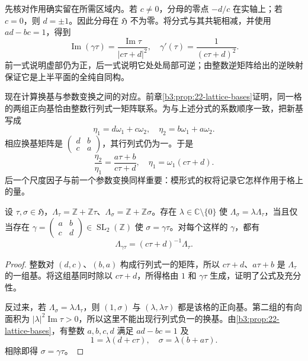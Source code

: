 先核对作用确实留在所需区域内。若 \(c\ne0\)，分母的零点 \(-d/c\) 在实轴上；若 \(c=0\)，则 \(d=\pm1\)。因此分母在 \(\mathfrak H\) 不为零。将分式与其共轭相减，并使用 \(ad-bc=1\)，得到
\begin{equation}\label{b3:eq:23-imaginary-transformation}
 \operatorname{Im}(\gamma\tau)
 =\frac{\operatorname{Im}\tau}{|c\tau+d|^2},
 \quad \gamma'(\tau)=\frac1{(c\tau+d)^2}.
\end{equation}
前一式说明虚部仍为正，后一式说明它处处局部可逆；由整数逆矩阵给出的逆映射保证它是上半平面的全纯自同构。

现在计算换基与参数变换之间的对应。前章\cref{b3:prop:22-lattice-bases}证明，同一格的两组正向基恰由整数行列式一矩阵联系。为与上述分式的系数顺序一致，把新基写成
\begin{equation}\label{b3:eq:23-basis-change}
 \eta_1=d\omega_1+c\omega_2,
 \quad \eta_2=b\omega_1+a\omega_2.
\end{equation}
相应换基矩阵是 \(\left(\begin{smallmatrix}d&b\\c&a\end{smallmatrix}\right)\)，其行列式仍为一。于是
\[
 \frac{\eta_2}{\eta_1}
 =\frac{a\tau+b}{c\tau+d},
 \quad \eta_1=\omega_1(c\tau+d).
\]
后一个尺度因子与前一个参数变换同样重要：模形式的权将记录它怎样作用于格上的量。

\begin{proposition}[参数轨道与比例格]\label{b3:prop:23-lattice-orbits}
设 \(\tau,\sigma\in\mathfrak H\)，\(\Lambda_\tau=\mathbb Z+\mathbb Z\tau\)、\(\Lambda_\sigma=\mathbb Z+\mathbb Z\sigma\)。存在 \(\lambda\in\mathbb C\setminus\{0\}\) 使 \(\Lambda_\sigma=\lambda\Lambda_\tau\)，当且仅当存在
\(\gamma=\left(\begin{smallmatrix}a&b\\c&d\end{smallmatrix}\right)\in\operatorname{SL}_2(\mathbb Z)\) 使 \(\sigma=\gamma\tau\)。对每个这样的 \(\gamma\)，都有
\begin{equation}\label{b3:eq:23-lattice-transformation}
 \Lambda_{\gamma\tau}=(c\tau+d)^{-1}\Lambda_\tau.
\end{equation}
\end{proposition}
\begin{proof}
整数对 \((d,c)\)、\((b,a)\) 构成行列式一的矩阵，所以 \(c\tau+d\)、\(a\tau+b\) 是 \(\Lambda_\tau\) 的一组基。将这组基同时除以 \(c\tau+d\)，所得格由 \(1\) 和 \(\gamma\tau\) 生成，证明了公式及充分性。

反过来，若 \(\Lambda_\sigma=\lambda\Lambda_\tau\)，则 \((1,\sigma)\) 与 \((\lambda,\lambda\tau)\) 都是该格的正向基。第二组的有向面积为 \(|\lambda|^2\operatorname{Im}\tau>0\)，所以这里不能出现行列式负一的换基。由\cref{b3:prop:22-lattice-bases}，有整数 \(a,b,c,d\) 满足 \(ad-bc=1\) 及
\[
 1=\lambda(d+c\tau),\quad
 \sigma=\lambda(b+a\tau).
\]
相除即得 \(\sigma=\gamma\tau\)。
\end{proof}

